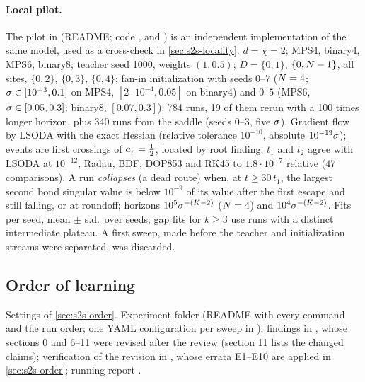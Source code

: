 \paragraph{Local pilot.}
The pilot in  (README; code ,
 and ) is an independent implementation of the same model, used as
a cross-check in \cref{sec:s2s-locality}. $d=\chi=2$; MPS4, binary4, MPS6, binary8; teacher seed 1000, weights $(1,0.5)$;
$D=\{0,1\}$, $\{0,N-1\}$, all sites, $\{0,2\}$, $\{0,3\}$, $\{0,4\}$; fan-in initialization with seeds
$0$--$7$ ($N=4$; $\sigma\in[10^{-3},0.1]$ on MPS4, $[2\cdot10^{-4},0.05]$ on binary4) and $0$--$5$ (MPS6,
$\sigma\in[0.05,0.3]$; binary8, $[0.07,0.3]$): 784 runs, 19 of them rerun with a 100 times longer horizon,
plus 340 runs from the saddle (seeds $0$--$3$, five $\sigma$). Gradient flow by LSODA with the exact
Hessian (relative tolerance $10^{-10}$, absolute $10^{-13}\sigma$); events are first crossings of
$a_{r}=\frac12$, located by root finding; $t_1$ and $t_2$ agree with LSODA at $10^{-12}$, Radau, BDF,
DOP853 and RK45 to $1.8\cdot10^{-7}$ relative (47 comparisons). A run \emph{collapses} (a dead route) when, at
$t\ge30\,t_1$, the largest second bond singular value is below $10^{-9}$ of its value after the first
escape and still falling, or at roundoff; horizons $10^5\sigma^{-(K-2)}$ ($N=4$) and
$10^4\sigma^{-(K-2)}$. Fits per seed, mean $\pm$ s.d.\ over seeds; gap fits for $k\ge3$ use runs with a
distinct intermediate plateau. A first sweep, made before the teacher and initialization streams
were separated, was discarded.

\subsection{Order of learning}\label{app:exp-order}
Settings of \cref{sec:s2s-order}. Experiment folder  (README with every command and
the run order; one YAML configuration per sweep in ); findings in , whose
sections 0 and 6--11 were revised after the review  (section 11 lists the
changed claims); verification of the revision in , whose errata
E1--E10 are applied in \cref{sec:s2s-order}; running report .

